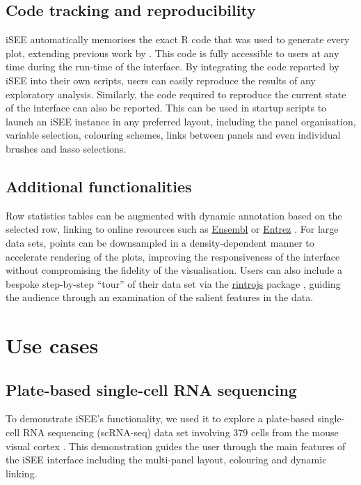 \documentclass[10pt,a4paper,twocolumn]{article}
\let\cite\citep
\begin{document}
\subsection*{Code tracking and reproducibility}

iSEE automatically memorises the exact R code that was used to generate every plot, extending previous work by \citet{marini2016interrepro}.
This code is fully accessible to users at any time during the run-time of the interface.
By integrating the code reported by iSEE into their own scripts, users can easily reproduce the results of any exploratory analysis.
Similarly, the code required to reproduce the current state of the interface can also be reported.
This can be used in startup scripts to launch an iSEE instance in any preferred layout, including the panel organisation, variable selection, colouring schemes, links between panels and even individual brushes and lasso selections.

\subsection*{Additional functionalities}
Row statistics tables can be augmented with dynamic annotation based on the selected row, linking to online resources such as \href{https://www.ensembl.org/index.html}{Ensembl} \citep{zerbino2018ensembl} or  \href{https://www.ncbi.nlm.nih.gov/Class/MLACourse/Original8Hour/Entrez/}{Entrez} \citep{ncbi2017entrez}. %
For large data sets, points can be downsampled in a density-dependent manner to accelerate rendering of the plots, improving the responsiveness of the interface without compromising the fidelity of the visualisation.
Users can also include a bespoke step-by-step ``tour'' of their data set via the \href{https://introjs.com/}{rintrojs} package \cite{ganz2016rintrojs}, guiding the audience through an examination of the salient features in the data.

\section*{Use cases} %

\subsection*{Plate-based single-cell RNA sequencing}
To demonstrate iSEE's functionality, we used it to explore a plate-based single-cell RNA sequencing (scRNA-seq) data set involving 379 cells from the mouse visual cortex \citep{tasic2016allen}.
This demonstration guides the user through the main features of the iSEE interface including the multi-panel layout, colouring and dynamic linking.\\
\end{document}
